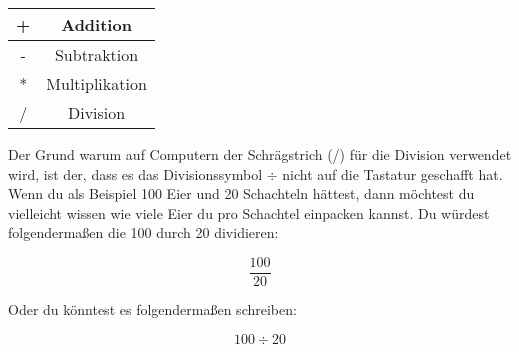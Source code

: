\begin{center}
\begin{tabular}{|c|c|}
\hline
+ & Addition \\
\hline
- & Subtraktion \\
\hline
* & Multiplikation \\
\hline
/ & Division \\
\hline
\end{tabular}
\end{center}

Der Grund warum auf Computern der Schrägstrich (/) für die Division verwendet wird, ist der, dass es das Divisionssymbol $\div$ nicht auf die Tastatur geschafft hat. Wenn du als Beispiel 100 Eier und 20 Schachteln hättest, dann möchtest du vielleicht wissen wie viele Eier du pro Schachtel einpacken kannst. Du würdest folgendermaßen die 100 durch 20 dividieren:

\begin{displaymath}
\frac{100}{20}
\end{displaymath}



Oder du könntest es folgendermaßen schreiben:

\begin{displaymath}
100 \div 20
\end{displaymath}

